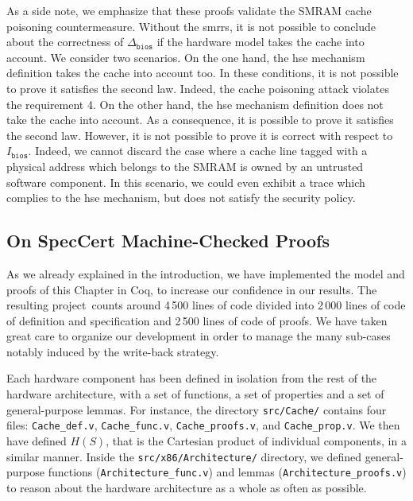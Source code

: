 As a side note, we emphasize that these proofs validate the SMRAM cache
poisoning countermeasure.
%
Without the \acp{smrr}, it is not possible to conclude about the correctness of
\( \Delta_{\mathtt{bios}} \) if the hardware model takes the cache into account.
%
We consider two scenarios.
%
On the one hand, the \ac{hse} mechanism definition takes the cache into account
too.
%
In these conditions, it is not possible to prove it satisfies the second law.
%
Indeed, the cache poisoning attack violates the requirement 4.
%
On the other hand, the \ac{hse} mechanism definition does not take the cache
into account.
%
As a consequence, it is possible to prove it satisfies the second law.
%
However, it is not possible to prove it is correct with respect to
$I_{\mathtt{bios}}$.
%
Indeed, we cannot discard the case where a cache line tagged with a physical
address which belongs to the SMRAM is owned by an untrusted software component.
%
In this scenario, we could even exhibit a trace which complies to the \ac{hse}
mechanism, but does not satisfy the security policy.

\subsection{On SpecCert Machine-Checked Proofs}
\label{subsec:speccert2:coqproofs}

As we already explained in the introduction, we have implemented the model and
proofs of this Chapter in Coq, to increase our confidence in our results.
%
The resulting project\,\cite{letan2016speccertcode} counts around 4\,500 lines
of code divided into 2\,000 lines of code of definition and specification and
2\,500 lines of code of proofs.
%
We have taken great care to organize our development in order to manage the
many sub-cases notably induced by the write-back strategy.

Each hardware component has been defined in isolation from the rest of the
hardware architecture, with a set of functions, a set of properties and a set of
general-purpose lemmas.
%
For instance, the directory \texttt{src/Cache/} contains four files:
\texttt{Cache\_def.v}, \texttt{Cache\_func.v}, \texttt{Cache\_proofs.v}, and
\texttt{Cache\_prop.v}.
%
We then have defined \( H(S) \), that is the Cartesian product of individual
components, in a similar manner.
%
Inside the \texttt{src/x86/Architecture/} directory, we defined general-purpose
functions (\texttt{Architecture\_func.v}) and lemmas
(\texttt{Architecture\_proofs.v}) to reason about the hardware architecture as a
whole as often as possible.

